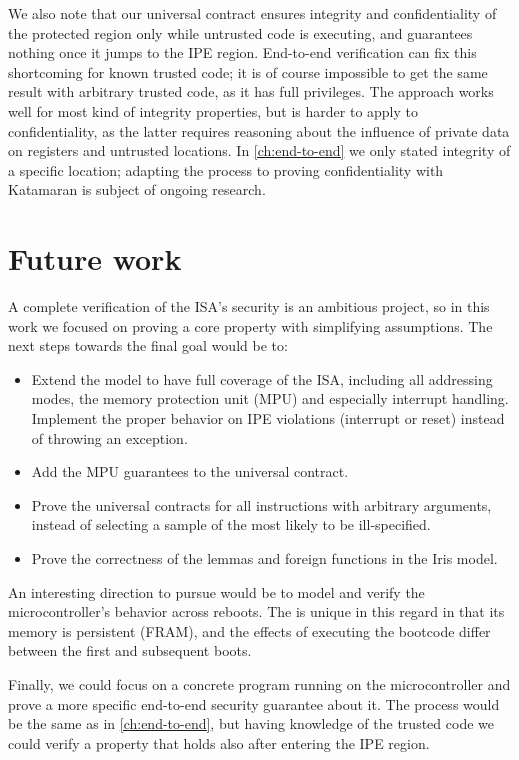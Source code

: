 We also note that our universal contract ensures integrity and confidentiality of the protected region only while untrusted code is executing, and guarantees nothing once it jumps to the IPE region. End-to-end verification can fix this shortcoming for known trusted code; it is of course impossible to get the same result with arbitrary trusted code, as it has full privileges. The approach works well for most kind of integrity properties, but is harder to apply to confidentiality, as the latter requires reasoning about the influence of private data on registers and untrusted locations. In \cref{ch:end-to-end} we only stated integrity of a specific location; adapting the process to proving confidentiality with Katamaran is subject of ongoing research.

\section{Future work}

A complete verification of the \msp ISA's security is an ambitious project, so in this work we focused on proving a core property with simplifying assumptions. The next steps towards the final goal would be to:
\begin{itemize}
\item Extend the model to have full coverage of the \msp ISA, including all addressing modes, the memory protection unit (MPU) and especially interrupt handling. Implement the proper behavior on IPE violations (interrupt or reset) instead of throwing an exception.
\item Add the MPU guarantees to the universal contract.
\item Prove the universal contracts for all instructions with arbitrary arguments, instead of selecting a sample of the most likely to be ill-specified.
\item Prove the correctness of the lemmas and foreign functions in the Iris model.
\end{itemize}

An interesting direction to pursue would be to model and verify the microcontroller's behavior across reboots. The \msp is unique in this regard in that its memory is persistent (FRAM), and the effects of executing the bootcode differ between the first and subsequent boots.

Finally, we could focus on a concrete program running on the microcontroller and prove a more specific end-to-end security guarantee about it. The process would be the same as in \cref{ch:end-to-end}, but having knowledge of the trusted code we could verify a property that holds also after entering the IPE region.

